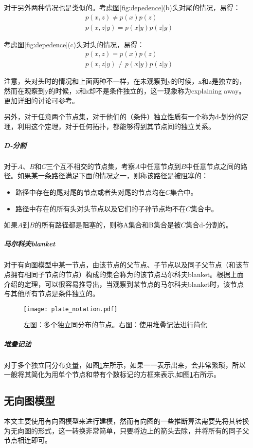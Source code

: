 对于另外两种情况也是类似的。考虑图\ref{fig:depedence}(b)头对尾的情况，易得：
\begin{equation}
\begin{split}
&p(x,z) \neq p(x)p(z)\\
&p(x,z|y) = p(x|y)p(z|y)
\end{split} 
\end{equation}

考虑图\ref{fig:depedence}(c)头对头的情况，易得：
\begin{equation}
\begin{split}
&p(x,z) = p(x)p(z)\\
&p(x,z|y) \neq p(x|y)p(z|y)
\end{split} 
\end{equation}

注意，头对头时的情况和上面两种不一样，在未观察到y的时候，x和z是独立的，然而在观察到y的时候，x和z却不是条件独立的，这一现象称为explaining away。更加详细的讨论可参考\cite{bishop2006pattern}。

另外，对于任意两个节点集，对于他们的（条件）独立性质有一个称为d-划分的定理，利用这个定理，对于任何拓扑，都能够得到其节点间的独立关系。
\subparagraph{D-分割}
对于$A$、$B$和$C$三个互不相交的节点集，考察$A$中任意节点到$B$中任意节点之间的路径。如果某一条路径满足下面的情况之一，则称该路径是被阻塞的：
\begin{itemize}
   \item 路径中存在的尾对尾的节点或者头对尾的节点均在$C$集合中。
   \item 路径中存在的所有头对头节点以及它们的子孙节点均不在$C$集合中。
\end{itemize}
如果$A$到$B$的所有路径都是阻塞的，则称A集合和B集合是被$C$集合d-分割的。

\subparagraph{马尔科夫blanket}
对于有向图模型中某一节点，由该节点的父节点、子节点以及同子父节点（和该节点拥有相同子节点的节点）构成的集合称为的该节点马尔科夫blanket。根据上面介绍的定理，可以很容易推导出，当观察到某节点的马尔科夫blanket时，该节点与其他所有节点是条件独立的。
\begin{figure}
\texttt{[image: plate\_notation.pdf]} 
  \caption{左图：多个独立同分布的节点。右图：使用堆叠记法进行简化} \label{fig:plate_notation}
\end{figure}
\subparagraph{堆叠记法}
对于多个独立同分布变量，如图\ref{fig:plate_notation}左所示，如果一一表示出来，会非常繁琐，所以一般将其简化为用单个节点和带有个数标记的方框来表示,如图\ref{fig:plate_notation}右所示。

\subsection{无向图模型}
本文主要使用有向图模型来进行建模，然而有向图的一些推断算法需要先将其转换为无向图的形式，这一转换非常简单，只要将边上的箭头去除，并将所有的同子父节点相连即可。

